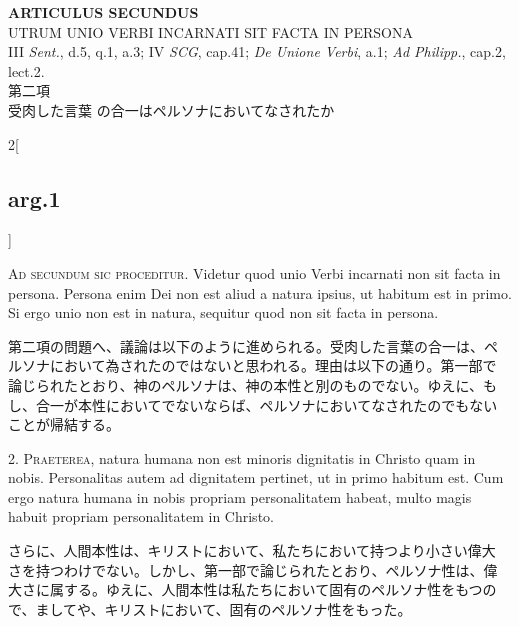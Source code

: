 \documentclass[paper=a4paper,fontsize=10pt,jafontsize=9pt,titlepage]{jlreq}
\begin{document}
{}
\setcounter{section}{2}
\setcounter{subsection}{0}
\begin{center}
{\Large {\bfseries ARTICULUS SECUNDUS}}\\ {\large UTRUM UNIO VERBI INCARNATI
SIT FACTA IN PERSONA}\\ {\footnotesize III {\itshape Sent.}, d.5, q.1,
a.3; IV {\itshape SCG}, cap.41; {\itshape De Unione Verbi}, a.1;
{\itshape Ad Philipp.}, cap.2, lect.2.}\\ {\Large 第二項\\受肉した言葉
の合一はペルソナにおいてなされたか}
\end{center}

\begin{paracol}{2}[\subsection{arg.1}]

{\Huge A}{\scshape d secundum sic proceditur}. Videtur quod unio Verbi
incarnati non sit facta in persona. Persona enim Dei non est aliud a
natura ipsius, ut habitum est in primo. Si ergo unio non est in
natura, sequitur quod non sit facta in persona.

\switchcolumn

第二項の問題へ、議論は以下のように進められる。受肉した言葉の合一は、ペ
ルソナにおいて為されたのではないと思われる。理由は以下の通り。第一部で
論じられたとおり、神のペルソナは、神の本性と別のものでない。ゆえに、も
し、合一が本性においてでないならば、ペルソナにおいてなされたのでもない
ことが帰結する。


2. {\scshape Praeterea}, natura humana non est minoris dignitatis in
Christo quam in nobis. Personalitas autem ad dignitatem pertinet, ut
in primo habitum est. Cum ergo natura humana in nobis propriam
personalitatem habeat, multo magis habuit propriam personalitatem in
Christo.

\switchcolumn

さらに、人間本性は、キリストにおいて、私たちにおいて持つより小さい偉大
さを持つわけでない。しかし、第一部で論じられたとおり、ペルソナ性は、偉
大さに属する。ゆえに、人間本性は私たちにおいて固有のペルソナ性をもつの
で、ましてや、キリストにおいて、固有のペルソナ性をもった。


\end{paracol}
\end{document}
